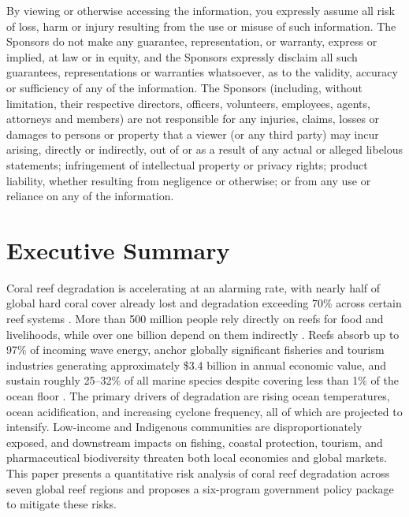 \documentclass[10pt,letterpaper]{article}
\begin{document}
\begin{titlepage}
{\begin{flushleft}
    By viewing or otherwise accessing the information, you expressly assume all risk of loss, harm or injury resulting from the use or misuse of such information. The Sponsors do not make any guarantee, representation, or warranty, express or implied, at law or in equity, and the Sponsors expressly disclaim all such guarantees, representations or warranties whatsoever, as to the validity, accuracy or sufficiency of any of the information. The Sponsors (including, without limitation, their respective directors, officers, volunteers, employees, agents, attorneys and members) are not responsible for any injuries, claims, losses or damages to persons or property that a viewer (or any third party) may incur arising, directly or indirectly, out of or as a result of any actual or alleged libelous statements; infringement of intellectual property or privacy rights; product liability, whether resulting from negligence or otherwise; or from any use or reliance on any of the information.
    \end{flushleft}
    }
\end{titlepage}

\clearpage
{}
\setcounter{page}{1}
\pagestyle{body}

\section*{Executive Summary}

\noindent Coral reef degradation is accelerating at an alarming rate, with nearly half of global hard coral cover already lost and degradation exceeding 70\% across certain reef systems \cite{burke_reefs_risk_2011, cesar_economics_2003}. More than 500 million people rely directly on reefs for food and livelihoods, while over one billion depend on them indirectly \cite{noaa_2026_econ}. Reefs absorb up to 97\% of incoming wave energy, anchor globally significant fisheries and tourism industries generating approximately \$3.4 billion in annual economic value, and sustain roughly 25--32\% of all marine species despite covering less than 1\% of the ocean floor \cite{cesar_beukering_2004, moberg_folke_1999, epa_2025}. The primary drivers of degradation are rising ocean temperatures, ocean acidification, and increasing cyclone frequency, all of which are projected to intensify. Low-income and Indigenous communities are disproportionately exposed, and downstream impacts on fishing, coastal protection, tourism, and pharmaceutical biodiversity threaten both local economies and global markets. This paper presents a quantitative risk analysis of coral reef degradation across seven global reef regions and proposes a six-program government policy package to mitigate these risks.
\end{document}

